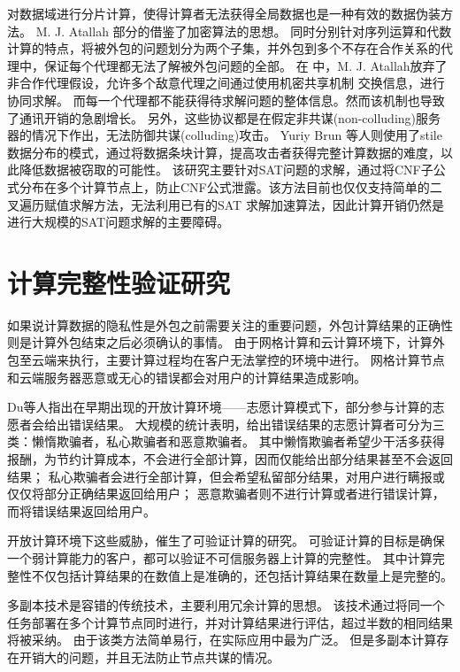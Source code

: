 对数据域进行分片计算，使得计算者无法获得全局数据也是一种有效的数据伪装方法。
M. J. Atallah 部分的借鉴了加密算法的思想。
同时分别针对序列运算和代数计算的特点，将被外包的问题划分为两个子集，并外包到多个不存在合作关系的代理中，保证每个代理都无法了解被外包问题的全部。
在 中，M. J. Atallah放弃了非合作代理假设，允许多个敌意代理之间通过使用机密共享机制
 交换信息，进行协同求解。
而每一个代理都不能获得待求解问题的整体信息。然而该机制也导致了通讯开销的急剧增长。
另外，这些协议都是在假定非共谋(non-colluding)服务器的情况下作出，无法防御共谋(colluding)攻击。
Yuriy Brun 等人则使用了stile数据分布的模式，通过将数据条块计算，提高攻击者获得完整计算数据的难度，以此降低数据被窃取的可能性。
该研究主要针对SAT问题的求解，通过将CNF子公式分布在多个计算节点上，防止CNF公式泄露。该方法目前也仅仅支持简单的二叉遍历赋值求解方法，无法利用已有的SAT 求解加速算法，因此计算开销仍然是进行大规模的SAT问题求解的主要障碍。


\section{计算完整性验证研究}
如果说计算数据的隐私性是外包之前需要关注的重要问题，外包计算结果的正确性则是计算外包结束之后必须确认的事情。
由于网格计算和云计算环境下，计算外包至云端来执行，主要计算过程均在客户无法掌控的环境中进行。
网格计算节点和云端服务器恶意或无心的错误都会对用户的计算结果造成影响。

Du等人指出在早期出现的开放计算环境——志愿计算模式下，部分参与计算的志愿者会给出错误结果。
大规模的统计表明，给出错误结果的志愿计算者可分为三类：懒惰欺骗者，私心欺骗者和恶意欺骗者。
其中懒惰欺骗者希望少干活多获得报酬，为节约计算成本，不会进行全部计算，因而仅能给出部分结果甚至不会返回结果；
私心欺骗者会进行全部计算，但会希望私留部分结果，对用户进行瞒报或仅仅将部分正确结果返回给用户；
恶意欺骗者则不进行计算或者进行错误计算，而将错误结果返回给用户。

开放计算环境下这些威胁，催生了可验证计算的研究。
可验证计算的目标是确保一个弱计算能力的客户，都可以验证不可信服务器上计算的完整性。
其中计算完整性不仅包括计算结果的在数值上是准确的，还包括计算结果在数量上是完整的。

多副本技术是容错的传统技术，主要利用冗余计算的思想。
该技术通过将同一个任务部署在多个计算节点同时进行，并对计算结果进行评估，超过半数的相同结果将被采纳。
由于该类方法简单易行，在实际应用中最为广泛。
但是多副本计算存在开销大的问题，并且无法防止节点共谋的情况。

